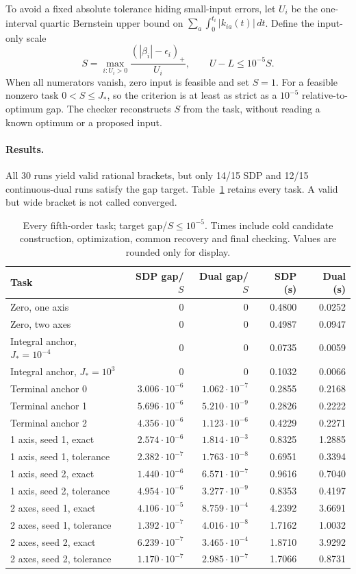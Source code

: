 \documentclass[pdflatex,sn-mathphys-num]{sn-jnl}
\theoremstyle{thmstyleone}
\theoremstyle{thmstyletwo}\newtheorem{remark}[theorem]{Remark}
\begin{document}
To avoid a fixed absolute tolerance hiding small-input errors, let $U_i$ be
the one-interval quartic Bernstein upper bound on
$\sum_a\int_0^{t_i}|k_{ia}(t)|\,dt$. Define the input-only scale
\[
 S=\max_{i:U_i>0}\frac{(|\beta_i|-\epsilon_i)_+}{U_i},
 \qquad U-L\le10^{-5}S.
\]
When all numerators vanish, zero input is feasible and set $S=1$.
For a feasible nonzero task $0<S\le J_*$, so the criterion is at least
as strict as a $10^{-5}$ relative-to-optimum gap. The checker reconstructs
$S$ from the task, without reading a known optimum or a proposed input.

\paragraph{Results.}
All 30 runs yield valid rational brackets, but only 14/15 SDP and 12/15
continuous-dual runs satisfy the gap target. Table~\ref{tab:five-pilot}
retains every task. A valid but wide bracket is not called converged.
\begin{table}[htbp]
\centering\small
\caption{Every fifth-order task; target gap/$S\le10^{-5}$. Times include
cold candidate construction, optimization, common recovery and final checking.
Values are rounded only for display.}\label{tab:five-pilot}
\begin{tabular}{lrrrr}
\toprule
Task & SDP gap/$S$ & Dual gap/$S$ & SDP (s) & Dual (s)\\
\midrule
Zero, one axis & 0 & 0 & 0.4800 & 0.0252\\
Zero, two axes & 0 & 0 & 0.4987 & 0.0947\\
Integral anchor, $J_*=10^{-4}$ & 0 & 0 & 0.0735 & 0.0059\\
Integral anchor, $J_*=10^3$ & 0 & 0 & 0.1032 & 0.0066\\
Terminal anchor 0 & $3.006\cdot10^{-6}$ & $1.062\cdot10^{-7}$ & 0.2855 & 0.2168\\
Terminal anchor 1 & $5.696\cdot10^{-6}$ & $5.210\cdot10^{-9}$ & 0.2826 & 0.2222\\
Terminal anchor 2 & $4.356\cdot10^{-6}$ & $1.123\cdot10^{-6}$ & 0.4229 & 0.2271\\
1 axis, seed 1, exact & $2.574\cdot10^{-6}$ & $1.814\cdot10^{-3}$ & 0.8325 & 1.2885\\
1 axis, seed 1, tolerance & $2.382\cdot10^{-7}$ & $1.763\cdot10^{-8}$ & 0.6951 & 0.3394\\
1 axis, seed 2, exact & $1.440\cdot10^{-6}$ & $6.571\cdot10^{-7}$ & 0.9616 & 0.7040\\
1 axis, seed 2, tolerance & $4.954\cdot10^{-6}$ & $3.277\cdot10^{-9}$ & 0.8353 & 0.4197\\
2 axes, seed 1, exact & $4.106\cdot10^{-5}$ & $8.759\cdot10^{-4}$ & 4.2392 & 3.6691\\
2 axes, seed 1, tolerance & $1.392\cdot10^{-7}$ & $4.016\cdot10^{-8}$ & 1.7162 & 1.0032\\
2 axes, seed 2, exact & $6.239\cdot10^{-7}$ & $3.465\cdot10^{-4}$ & 1.8710 & 3.9292\\
2 axes, seed 2, tolerance & $1.170\cdot10^{-7}$ & $2.985\cdot10^{-7}$ & 1.7066 & 0.8731\\
\bottomrule
\end{tabular}
\end{table}
\end{document}
